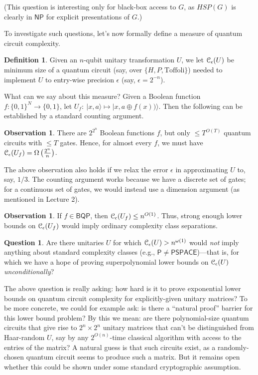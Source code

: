 \documentclass[12pt]{report}
\theoremstyle{plain}
\theoremstyle{definition}
\newtheorem{definition}[theorem]{Definition}
\newtheorem{question}[theorem]{Question}
\newtheorem{observation}[theorem]{Observation}
\renewcommand{\ket}[1]{|#1\rangle}
\begin{document}
(This question is interesting only for black-box access to $G$, as $HSP(G)$ is clearly in $\mathsf{NP}$ for explicit presentations of $G$.)

To investigate such questions, let's now formally define a measure of quantum circuit complexity.

\begin{definition}
Given an $n$-qubit unitary transformation $U$, we let ${\cal C}_{\epsilon}(U)$ be minimum size of a quantum circuit (say, over $\{H,P,\mbox{Toffoli}\}$) needed to implement $U$ to entry-wise precision $\epsilon$ (say, $\epsilon=2^{-n}$).
\end{definition}

What can we say about this measure?  Given a Boolean function $f:\{0,1\}^N\to\{0,1\}$, let $U_f:\ \ket{x,a}\mapsto \ket{x,a\oplus f(x))}$.  Then the following can be established by a standard counting argument.

\begin{observation}
There are $2^{2^n}$ Boolean functions $f$, but only $\leq T^{O(T)}$ quantum circuits with $\leq T$ gates.  Hence, for almost every $f$,
we must have ${\cal C}_{\epsilon}(U_f) = \Omega\left(\frac{2^n}n\right)$.
\end{observation}

The above observation also holds if we relax the error $\epsilon$ in approximating $U$ to, say, $1/3$. The counting argument works because we have a discrete set of gates; for a continuous set of gates, we would instead use a dimension argument (as mentioned in Lecture 2).

\begin{observation}
If $f\in \mathsf{BQP}$, then ${\cal C}_{\epsilon}(U_f)\leq n^{O(1)}$. Thus, strong enough lower bounds on ${\cal C}_{\epsilon}(U_f)$ would imply ordinary complexity
class separations.
\end{observation}

\begin{question}
Are there unitaries $U$ for which ${\cal C}_{\epsilon}(U) > n^{\omega(1)}$ would {\em not} imply anything about standard complexity classes (e.g., $\mathsf{P} \neq \mathsf{PSPACE}$)---that is, for which we have a hope of proving superpolynomial lower bounds on ${\cal C}_{\epsilon}(U)$ {\em unconditionally}?
\end{question}

The above question is really asking: how hard is it to prove exponential lower bounds on quantum circuit complexity for explicitly-given unitary matrices?  To be more concrete, we could for example ask: is there a ``natural proof'' barrier \cite{rr} for this lower bound problem?  By this we mean: are there polynomial-size quantum circuits that give rise to $2^n \times 2^n$ unitary matrices
that can't be distinguished from Haar-random $U$, say by any $2^{O(n)}$-time classical algorithm with access to the entries of the matrix?  A natural guess is that such circuits exist, as a randomly-chosen quantum circuit seems to produce such a matrix. But it remains open whether this could be shown under some standard cryptographic assumption.
\end{document}
